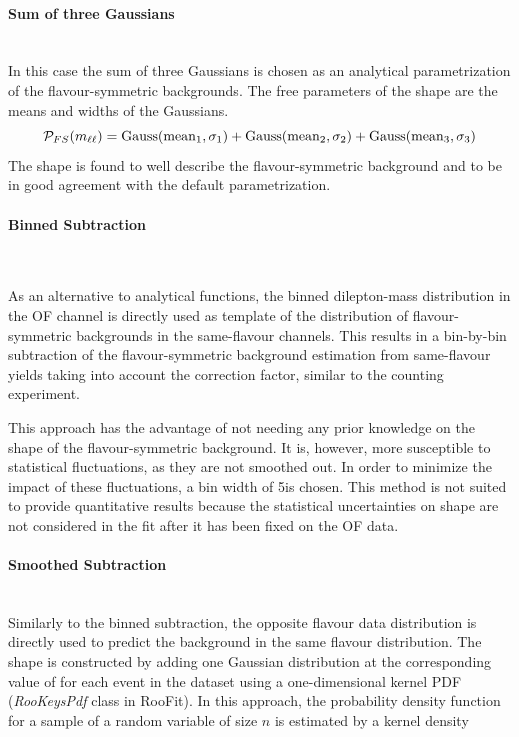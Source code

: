 \paragraph{Sum of three Gaussians}\mbox{} \\
In this case the sum of three Gaussians is chosen as an analytical parametrization of the flavour-symmetric backgrounds. The free parameters of the shape are the means and widths of the Gaussians.
\begin{equation*}
\mathcal{P}_{FS}(m_{\ell\ell}) = \mathrm{Gauss}(\mathrm{mean}_1,\sigma_1) + \mathrm{Gauss}(\mathrm{mean}_2,\sigma_2) + \mathrm{Gauss}(\mathrm{mean}_3,\sigma_3)\\
\end{equation*}
The shape is found to well describe the flavour-symmetric background and to be in good agreement with the default parametrization.
\paragraph{Binned Subtraction}\mbox{} \\


\label{shapesubtraction:binnedsubtraction}

As an alternative to analytical functions, the binned dilepton-mass distribution in the OF channel is directly used as  template of the distribution of flavour-symmetric backgrounds in the same-flavour channels. This results in a bin-by-bin subtraction of the flavour-symmetric background estimation from same-flavour yields taking into account the \Rsfof correction factor, similar to the counting experiment.

This approach has the advantage of not needing any prior knowledge on the shape of the flavour-symmetric background. It is, however, more susceptible to statistical fluctuations, as they are not smoothed out. In order to minimize the impact of these fluctuations, a bin width of 5\GeV is chosen. This method is not suited to provide quantitative results because the statistical uncertainties on shape are not considered in the fit after it has been fixed on the OF data.

\paragraph{Smoothed Subtraction}\mbox{} \\
Similarly to the binned subtraction, the opposite flavour data distribution is directly used to predict the background in the same flavour distribution. The shape is constructed by adding one Gaussian distribution at the corresponding value of \mll for each event in the dataset using a one-dimensional kernel PDF (\emph{RooKeysPdf} class in RooFit). In this approach, the probability density function for a sample of a random variable of size $n$ is estimated by a kernel density

